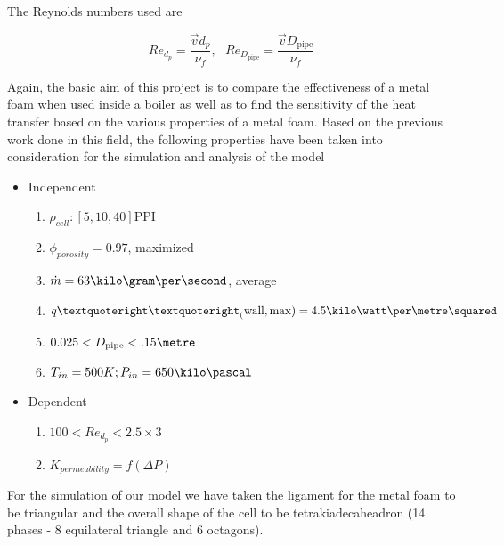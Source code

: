 \documentclass[compileTAMUreport.tex]{subfiles}
\begin{document}
The Reynolds numbers used are

\begin{equation}
Re_{d_{p}} = \frac{\vec{v} d_p}{\nu_f}, ~~~ Re_{D_{\mathrm{pipe}}} = \frac{\vec{v} D_{\mathrm{pipe}}}{\nu_f}
\end{equation}

Again, the basic aim of this project is to compare the effectiveness of a metal foam when used inside a boiler as well as to find the sensitivity of the heat transfer based on the various properties of a metal foam. Based on the previous work done in this field, the following properties have been taken into consideration for the simulation and analysis of the model


\begin{itemize}
	\item Independent
		\begin{enumerate}
			\item $\rho_{cell} : [5,10,40] \mathrm{PPI}$
			\item $\phi_{porosity}= 0.97$, maximized
			\item $\dot{m} =63 \kilo\gram\per\second$, average
			\item $ q’’_(\mathrm{wall,max})=4.5 \kilo\watt\per\metre\squared$
			\item $ 0.025 < D_{\mathrm{pipe}} < .15 \metre$
			\item $ T_{in}=500K;P_{in} = 650 \kilo\pascal $
		\end{enumerate}
	\item Dependent
		\begin{enumerate}
			\item $100 < Re_{d_p} < 2.5 \times 3$
			\item $K_{permeability}= f(\Delta P)$
		\end{enumerate}
\end{itemize}

For the simulation of our model we have taken the ligament for the metal foam to be triangular and the overall shape of the cell to be tetrakiadecaheadron (14 phases - 8 equilateral triangle and 6 octagons).\cite{Boomsma2011}
\end{document}
